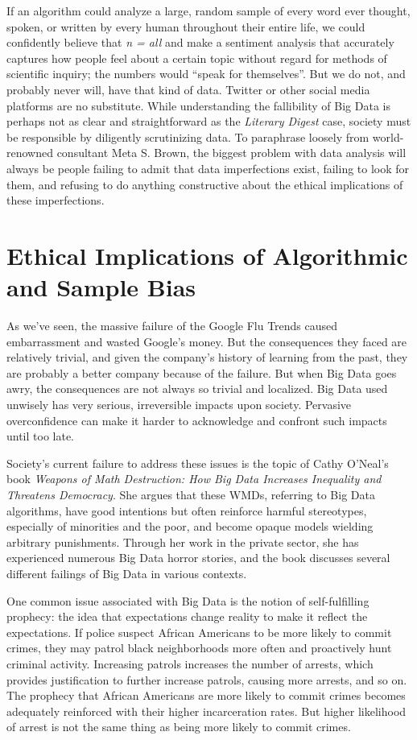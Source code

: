 \documentclass[sigconf]{acmart}
\begin{document}
If an algorithm could analyze a large, random sample of every word ever thought, spoken, or written by every human throughout their entire life, we could confidently believe that {\em n = all} and make a sentiment analysis that accurately captures how people feel about a certain topic without regard for methods of scientific inquiry; the numbers would ``speak for themselves''\cite{Anderson2008}. But we do not, and probably never will, have that kind of data. Twitter or other social media platforms are no substitute. While understanding the fallibility of Big Data is perhaps not as clear and straightforward as the {\em Literary Digest} case, society must be responsible by diligently scrutinizing data. To paraphrase loosely from world-renowned consultant Meta S. Brown, the biggest problem with data analysis will always be people failing to admit that data imperfections exist, failing to look for them, and refusing to do anything constructive about the ethical implications of these imperfections\cite{Brown2017}.

\section{Ethical Implications of Algorithmic and Sample Bias}

As we've seen, the massive failure of the Google Flu Trends caused embarrassment and wasted Google's money. But the consequences they faced are relatively trivial, and given the company's history of learning from the past, they are probably a better company because of the failure. But when Big Data goes awry, the consequences are not always so trivial and localized. Big Data used unwisely has very serious, irreversible impacts upon society. Pervasive overconfidence can make it harder to acknowledge and confront such impacts until too late. 

Society's current failure to address these issues is the topic of Cathy O'Neal's book {\em Weapons of Math Destruction: How Big Data Increases Inequality and Threatens Democracy}. She argues that these WMDs, referring to Big Data algorithms, have good intentions but often reinforce harmful stereotypes, especially of minorities and the poor, and become opaque models wielding arbitrary punishments. Through her work in the private sector, she has experienced numerous Big Data horror stories, and the book discusses several different failings of Big Data in various contexts.

One common issue associated with Big Data is the notion of self-fulfilling prophecy: the idea that expectations change reality to make it reflect the expectations. If police suspect African Americans to be more likely to commit crimes, they may patrol black neighborhoods more often and proactively hunt criminal activity. Increasing patrols increases the number of arrests, which provides justification to further increase patrols, causing more arrests, and so on. The prophecy that African Americans are more likely to commit crimes becomes adequately reinforced with their higher incarceration rates. But higher likelihood of arrest is not the same thing as being more likely to commit crimes\cite{Liu2017}.
\end{document}
